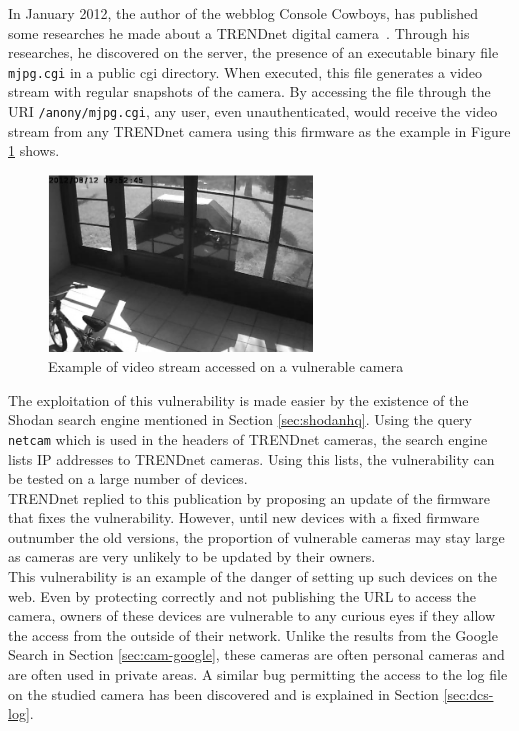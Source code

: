In January 2012, the author of the webblog Console Cowboys, has published some researches he made about a TRENDnet digital camera~\cite{trendnet-hack}.
Through his researches, he discovered on the server, the presence of an executable binary file \texttt{mjpg.cgi} in a public cgi directory.
When executed, this file generates a video stream with regular snapshots of the camera.
By accessing the file through the URI \texttt{/anony/mjpg.cgi}, any user, even unauthenticated, would receive the video stream from any TRENDnet camera using this firmware as the example in Figure \ref{fig:trendnet-hack} shows.\\

\begin{figure}[h]
  \centering
  \includegraphics[width=7cm]{images/trendnet-hack2.png}
  \caption{Example of video stream accessed on a vulnerable camera}
  \label{fig:trendnet-hack}
\end{figure}

The exploitation of this vulnerability is made easier by the existence of the Shodan search engine mentioned in Section \ref{sec:shodanhq}.
Using the query \texttt{netcam} which is used in the headers of TRENDnet cameras, the search engine lists IP addresses to TRENDnet cameras.
Using this lists, the vulnerability can be tested on a large number of devices.\\

TRENDnet replied to this publication by proposing an update of the firmware that fixes the vulnerability.
However, until new devices with a fixed firmware outnumber the old versions, the proportion of vulnerable cameras may stay large as cameras are very unlikely to be updated by their owners.\\

This vulnerability is an example of the danger of setting up such devices on the web.
Even by protecting correctly and not publishing the URL to access the camera, owners of these devices are vulnerable to any curious eyes if they allow the access from the outside of their network.
Unlike the results from the Google Search in Section \ref{sec:cam-google}, these cameras are often personal cameras and are often used in private areas.
A similar bug permitting the access to the log file on the studied camera has been discovered and is explained in Section \ref{sec:dcs-log}.